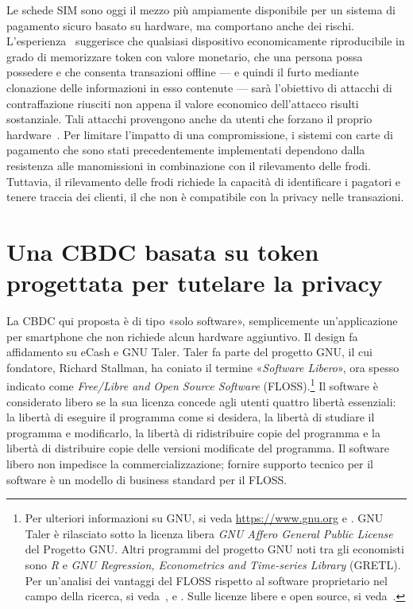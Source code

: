 \documentclass{article}
\begin{document}
Le schede SIM sono oggi il mezzo più ampiamente disponibile per un
sistema di pagamento sicuro basato su hardware, ma comportano anche
dei rischi. L'esperienza~\cite[si veda, ad esempio,][]{Soukup,Garcia,Kasper,CCC}
suggerisce che qualsiasi dispositivo economicamente riproducibile in grado
di memorizzare token con valore monetario, che una persona possa possedere
e che consenta transazioni offline --- e quindi il furto mediante
clonazione delle informazioni in esso contenute --- sarà l'obiettivo di
attacchi di contraffazione riusciti non appena il valore economico
dell'attacco risulti sostanziale. Tali attacchi provengono anche da
utenti che forzano il proprio hardware~\cite[vedi][]{Allen}. Per
limitare l'impatto di una compromissione, i sistemi con carte di pagamento
che sono stati precedentemente implementati dependono dalla resistenza
alle manomissioni in combinazione con il rilevamento delle frodi.
Tuttavia, il rilevamento delle frodi richiede la capacità di identificare
i pagatori e tenere traccia dei clienti, il che non è compatibile con la
privacy nelle transazioni.

\section{Una CBDC basata su token progettata per tutelare la privacy}
\label{4.-una-cbdc-basata-su-token-progettata-per-tutelare-la-privacy}

La CBDC qui proposta è di tipo «solo software», semplicemente
un'applicazione per smartphone che non richiede alcun hardware aggiuntivo.
Il design fa affidamento su eCash e GNU Taler. Taler fa parte del progetto
GNU, il cui fondatore, Richard Stallman, ha coniato il termine
«\emph{Software Libero}», ora spesso indicato come \textit{Free/Libre
and Open Source Software} (FLOSS).\footnote{Per ulteriori informazioni
su GNU, si veda \url{https://www.gnu.org} e \cite{Stallman}. GNU Taler
è rilasciato sotto la licenza libera \textit{GNU Affero General Public
License} del Progetto GNU. Altri programmi del progetto GNU noti tra gli
economisti sono \textit{R} e \textit{GNU Regression, Econometrics and
Time-series Library} (GRETL). Per un'analisi dei vantaggi del FLOSS
rispetto al software proprietario nel campo della ricerca, si veda~\cite{Baiocchi}, \cite{Yalta2008} e \cite{Yalta2010}.
Sulle licenze libere e open source, si veda~\cite{Lerner}.} Il software
è considerato libero se la sua licenza concede agli utenti quattro libertà
essenziali: la libertà di eseguire il programma come si desidera, la
libertà di studiare il programma e modificarlo, la libertà di ridistribuire
copie del programma e la libertà di distribuire copie delle versioni
modificate del programma. Il software libero non impedisce la
commercializzazione; fornire supporto tecnico per il software è un modello
di business standard per il FLOSS.
\end{document}
